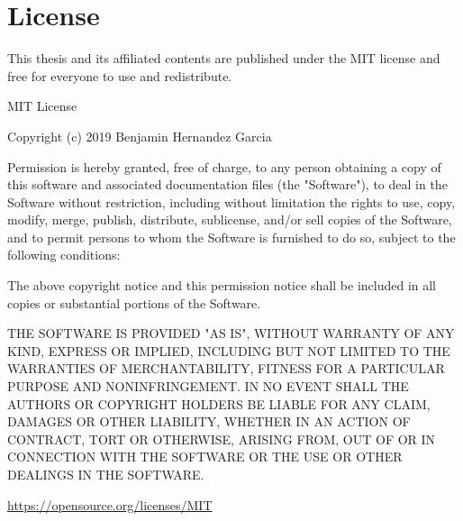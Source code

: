 
\chapter{License}

\label{AppendixC}

This thesis and its affiliated contents are published under the MIT license and free for everyone to use and redistribute.

MIT License

Copyright (c) 2019 Benjamin Hernandez Garcia

Permission is hereby granted, free of charge, to any person obtaining a copy
of this software and associated documentation files (the "Software"), to deal
in the Software without restriction, including without limitation the rights
to use, copy, modify, merge, publish, distribute, sublicense, and/or sell
copies of the Software, and to permit persons to whom the Software is
furnished to do so, subject to the following conditions:

The above copyright notice and this permission notice shall be included in all
copies or substantial portions of the Software.

THE SOFTWARE IS PROVIDED "AS IS", WITHOUT WARRANTY OF ANY KIND,
EXPRESS OR
IMPLIED, INCLUDING BUT NOT LIMITED TO THE WARRANTIES OF MERCHANTABILITY,
FITNESS FOR A PARTICULAR PURPOSE AND NONINFRINGEMENT. IN NO EVENT SHALL THE
AUTHORS OR COPYRIGHT HOLDERS BE LIABLE FOR ANY CLAIM, DAMAGES OR OTHER
LIABILITY, WHETHER IN AN ACTION OF CONTRACT, TORT OR OTHERWISE, ARISING FROM,
OUT OF OR IN CONNECTION WITH THE SOFTWARE OR THE USE OR OTHER DEALINGS IN THE
SOFTWARE.


\url{https://opensource.org/licenses/MIT}


